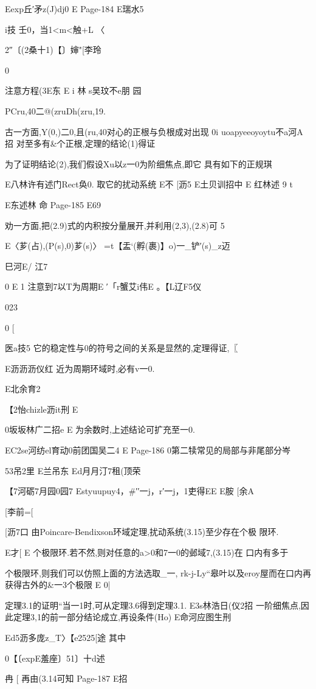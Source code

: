 {{{{{{{{{{{{{{{{{{{Eexp丘′矛z(J)dj0
E
Page-184
E瑞水5

i技
壬0，当1<m<触+L
〈

2″〔(2桑十1)【〕婶"[李玲

0

注意方程(3E东
E
i
林
s吴玟不e朋
园

PCru,40二@(zruDh(zru,19.

古一方面,Y(0,)二0,且(ru,40对心的正根与负根成对出现
0i
uoapyeeoyoytu不a河A招
对至多有&个正根,定理的结论(1)得证

为了证明结论(2),我们假设Xu以z一0为阶细焦点,即它
具有如下的正规琪

E八林许有述门Rect奂0.
取它的扰动系统
E不
[沥5
E土贝训招中
E
红林述
9
t

E东述林
命
Page-185
E69

劝一方面,把(2.9)式的内积按分量展开,并利用(2,3),(2.8)可
5

E〈芗(占),(P(s),0)芗(s)〉
=t【盂`(孵(裹)】o)一_铲′(s)_z迈

巳河E/
江7

0
E
1
注意到7以T为周期E
′「r蟹艾i伟E
。【L辽F5仪

023

0
[

医a技5
它的稳定性与0的符号之间的关系是显然的,定理得证,〖

E沥沥沥仪红
近为周期环域时,必有v一0.

E北余育2

【2怡chizle沥it刑
E

0坂坂林广二招e
E
为余数时,上述结论可扩充至一0.

EC2se河纺el育动0前团国吴二4
E
Page-186
0第二犊常见的局部与非尾部分岑

53吊2里
E兰吊东
Ed月月汀7租(顶荣

【7河砺7月园0园7
Estyuupuy4，#′′一j，r′一j，1吏得EE
E胺
[余A

[李前=[

[沥7口
由Poincare-Bendixson环域定理,扰动系统(3.15)至少存在个极
限环.

E才[
E
个极限环.若不然,则对任意的a>0和7一0的邺域7,(3.15)在
口内有多于}个极限环,则我们可以仿照上面的方法选取_一,
rk-j-Ly“皋叶以及eroy屋而在口内再获得古外的&一3个极限
E
0|

定理3.1的证明“当一1时,可从定理3.6得到定理3.1.
E3s林浩日(仪2招
一阶细焦点,因此定理3,1的前一部分结论成立,再设条件(Ho)
E命河应图生刑

Ed5沥多庞z_T〉【e2525[途
其中

0【〔expE羞座〕51〕十d述

冉
[
再由(3.14可知
Page-187
E招

}}}}}}}}}}}}}}}}}}
